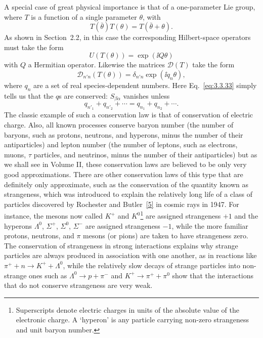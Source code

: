 A special case of great physical importance is that of a one-parameter Lie group,
where $T$ is a function of a single parameter $\theta$, with
\begin{equation}
T(\bar\theta)T(\theta)=T(\bar\theta+\theta).
\tag{3.3.37}\label{eq:3.3.37}
\end{equation}
As shown in Section~2.2, in this case the corresponding Hilbert-space operators
must take the form
\begin{equation}
U(T(\theta))=\exp(\ii Q\theta)
\tag{3.3.38}\label{eq:3.3.38}
\end{equation}
with $Q$ a Hermitian operator. Likewise the matrices $\mathcal{D}(T)$ take the form
\begin{equation}
\mathcal{D}_{n'n}(T(\theta))=\delta_{n'n}\exp(\ii q_n\theta),
\tag{3.3.39}\label{eq:3.3.39}
\end{equation}
where $q_n$ are a set of real species-dependent numbers. Here Eq.~\eqref{eq:3.3.33} simply
tells us that the $q$s are conserved: $S_{\beta\alpha}$ vanishes unless
\begin{equation}
q_{n'_1}+q_{n'_2}+\cdots=q_{n_1}+q_{n_2}+\cdots.
\tag{3.3.40}\label{eq:3.3.40}
\end{equation}
The classic example of such a conservation law is that of conservation of electric
charge. Also, all known processes conserve baryon number (the number of baryons,
such as protons, neutrons, and hyperons, minus the number of their antiparticles)
and lepton number (the number of leptons, such as electrons, muons, $\tau$ particles,
and neutrinos, minus the number of their antiparticles) but as we shall see in
Volume II, these conservation laws are believed to be only very good approximations.
There are other conservation laws of this type that are definitely only approximate,
such as the conservation of the quantity known as strangeness, which was introduced
to explain the relatively long life of a class of particles discovered by Rochester
and Butler~\hyperref[ref:3.5]{[5]} in cosmic rays in 1947. For instance, the mesons now called $K^+$ and
$K^0$\footnote{Superscripts denote electric charges in units of the absolute value
of the electronic charge. A `hyperon' is any particle carrying non-zero strangeness
and unit baryon number.} are assigned strangeness $+1$ and the hyperons
$\Lambda^0$, $\Sigma^+$, $\Sigma^0$, $\Sigma^-$ are assigned strangeness $-1$,
while the more familiar protons, neutrons, and $\pi$ mesons (or pions) are taken to
have strangeness zero. The conservation of strangeness in strong interactions
explains why strange particles are always produced in association with one another,
as in reactions like $\pi^++n\to K^++\Lambda^0$, while the relatively slow decays
of strange particles into non-strange ones such as $\Lambda^0\to p+\pi^-$ and
$K^+\to\pi^++\pi^0$ show that the interactions that do not conserve strangeness
are very weak.

